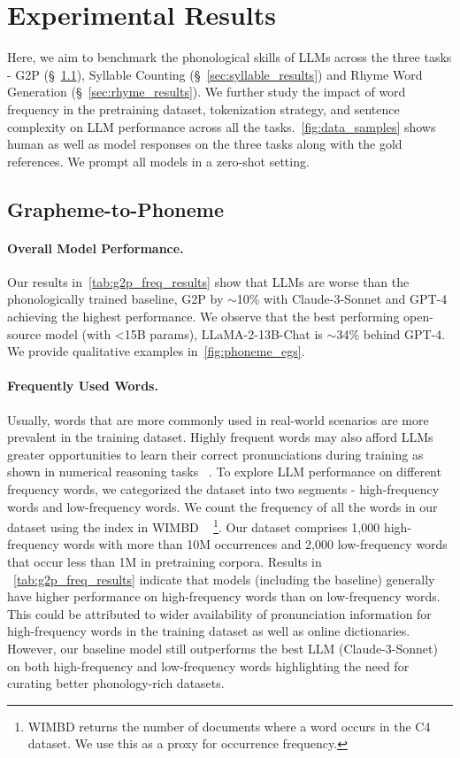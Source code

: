 \section{Experimental Results}
\label{sec:results}
Here, we aim to benchmark the phonological skills of LLMs across the three tasks - G2P (\S ~\ref{sec:g2p_results}), Syllable Counting (\S ~\ref{sec:syllable_results}) and Rhyme Word Generation (\S ~\ref{sec:rhyme_results}). We further study the impact of word frequency in the pretraining dataset, tokenization strategy, and sentence complexity on LLM performance across all the tasks.~\autoref{fig:data_samples} shows human as well as model responses on the three tasks along with the gold references. We prompt all models in a zero-shot setting.

\subsection{Grapheme-to-Phoneme}
\label{sec:g2p_results}
\paragraph{Overall Model Performance.} Our results in~\autoref{tab:g2p_freq_results} show that LLMs are worse than the phonologically trained baseline, G2P by $\sim$10\% with Claude-3-Sonnet and GPT-4 achieving the highest performance. We observe that the best performing open-source model (with <15B params), LLaMA-2-13B-Chat is $\sim$34\% behind GPT-4. We provide qualitative examples in~\autoref{fig:phoneme_egs}.

\paragraph{Frequently Used Words.} Usually, words that are more commonly used in real-world scenarios are more prevalent in the training dataset. Highly frequent words may also afford LLMs greater opportunities to learn their correct pronunciations during training as shown in numerical reasoning tasks ~\citep{razeghi2022impact}. To explore LLM performance on different frequency words, we categorized the dataset into two segments - high-frequency words and low-frequency words. We count the frequency of all the words in our dataset using the index in WIMBD ~\citep{elazar2024whats} \footnote{WIMBD returns the number of documents where a word occurs in the C4 ~\citep{raffel2023exploring} dataset. We use this as a proxy for occurrence frequency.}. Our dataset comprises 1,000 high-frequency words with more than 10M occurrences and 2,000 low-frequency words that occur less than 1M in pretraining corpora. Results in ~\autoref{tab:g2p_freq_results} indicate that models (including the baseline) generally have higher performance on high-frequency words than on low-frequency words. This could be attributed to wider availability of pronunciation information for high-frequency words in the training dataset as well as online dictionaries. However, our baseline model still outperforms the best LLM (Claude-3-Sonnet) on both high-frequency and low-frequency words highlighting the need for curating better phonology-rich datasets.

